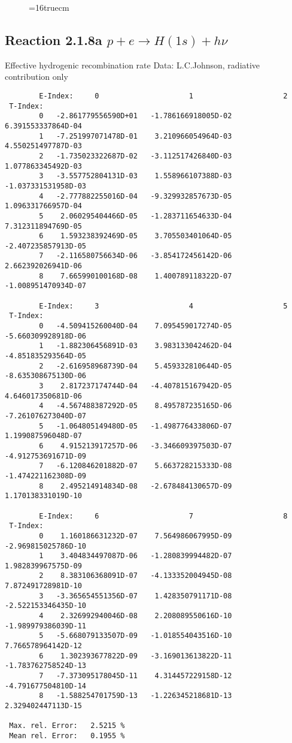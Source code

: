 \documentclass[12pt]{article}
\begin{document}
\begin{figure} \label{2.1.8FU}
\epsfxsize=16truecm
\end{figure}
\newpage


\subsection{
  Reaction 2.1.8a  $p + e \rightarrow H(1s) + h\nu $
}

   Effective hydrogenic recombination rate
   Data: L.C.Johnson, radiative contribution only


\begin{small}\begin{verbatim}
        E-Index:     0                     1                     2
 T-Index:
        0   -2.861779556590D+01   -1.786166918005D-02    6.391553337864D-04
        1   -7.251997071478D-01    3.210966054964D-03    4.550251497787D-03
        2   -1.735023322687D-02   -3.112517426840D-03    1.077863345492D-03
        3   -3.557752804131D-03    1.558966107388D-03   -1.037331531958D-03
        4   -2.777882255016D-04   -9.329932857673D-05    1.096331766957D-04
        5    2.060295404466D-05   -1.283711654633D-04    7.312311894769D-05
        6    1.593238392469D-05    3.705503401064D-05   -2.407235857913D-05
        7   -2.116580756634D-06   -3.854172456142D-06    2.662392026941D-06
        8    7.665990100168D-08    1.400789118322D-07   -1.008951470934D-07

        E-Index:     3                     4                     5
 T-Index:
        0   -4.509415260040D-04    7.095459017274D-05   -5.660309928918D-06
        1   -1.882306456891D-03    3.983133042462D-04   -4.851835293564D-05
        2   -2.616958968739D-04    5.459332810644D-05   -8.635308675130D-06
        3    2.817237174744D-04   -4.407815167942D-05    4.646017350681D-06
        4   -4.567488387292D-05    8.495787235165D-06   -7.261076273040D-07
        5   -1.064805149480D-05   -1.498776433806D-07    1.199087596048D-07
        6    4.915213917257D-06   -3.346609397503D-07   -4.912753691671D-09
        7   -6.120846201882D-07    5.663728215333D-08   -1.474221162308D-09
        8    2.495214914834D-08   -2.678484130657D-09    1.170138331019D-10

        E-Index:     6                     7                     8
 T-Index:
        0    1.160186631232D-07    7.564986067995D-09   -2.969815025786D-10
        1    3.404834497087D-06   -1.280839994482D-07    1.982839967575D-09
        2    8.383106368091D-07   -4.133352004945D-08    7.872491728981D-10
        3   -3.365654551356D-07    1.428350791171D-08   -2.522153346435D-10
        4    2.326992940046D-08    2.208089550616D-10   -1.989979386039D-11
        5   -5.668079133507D-09   -1.018554043516D-10    7.766578964142D-12
        6    1.302393677822D-09   -3.169013613822D-11   -1.783762758524D-13
        7   -7.373095178045D-11    4.314457229158D-12   -4.791677504810D-14
        8   -1.588254701759D-13   -1.226345218681D-13    2.329402447113D-15

 Max. rel. Error:   2.5215 %
 Mean rel. Error:   0.1955 %


\end{verbatim}\end{small}
\end{document}
